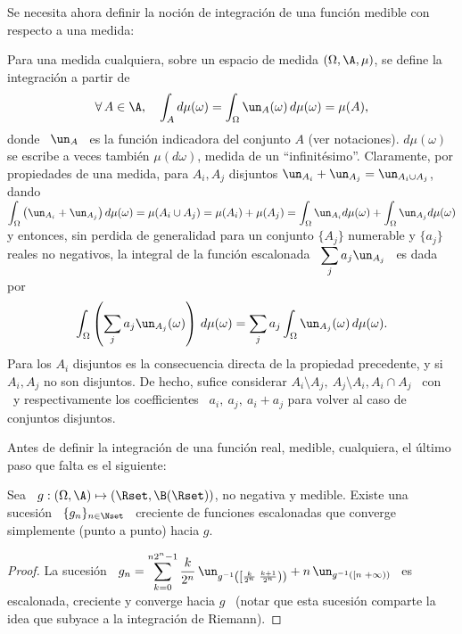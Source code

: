 Se necesita ahora definir la  noci\'on de integraci\'on de una funci\'on medible
con respecto a una medida:
%
\begin{definicion}
\label{Def:MP:MedidaIntegracion}
%
  Para una medida  cualquiera, sobre un espacio de  medida $(\Omega,\A,\mu)$, se
  define la integraci\'on a partir de
  \[
  \forall \, A \in \A,  \quad \int_A d\mu(\omega) = \int_\Omega \un_A(\omega) \,
  d\mu(\omega) = \mu(A),
  \]
  donde  \  $\un_A$  \  es   la  funci\'on  indicadora  del  conjunto  $A$  (ver
  notaciones).   $d\mu(\omega)$  se escribe  a  veces tambi\'en  $\mu(d\omega)$,
  medida de  un ``infinit\'esimo''.  Claramente, por propiedades  de una medida,
  para $ A_i, A_j$ disjuntos $\un_{A_i} + \un_{A_j} = \un_{A_i \cup A_j}$, dando
  $\displaystyle \int_\Omega \left( \un_{A_i} + \un_{A_j} \right) d\mu(\omega) =
  \mu(A_i \cup A_j) = \mu(A_i) + \mu(A_j) = \int_\Omega \un_{A_i} d\mu(\omega) +
  \int_\Omega  \un_{A_j} d\mu(\omega)$  y entonces,  sin perdida  de generalidad
  para un conjunto $\{ A_j \}$ numerable
  y $\{  a_j \}$ reales no negativos,  la integral de la  funci\'on escalonada \
  $\displaystyle \sum_j a_j \un_{A_j}$ \ es dada por
  \[
  \int_\Omega \left( \sum_j a_j \un_{A_j}(\omega) \right) \, d\mu(\omega) =
  \sum_j a_j \int_\Omega \un_{A_j}(\omega) \, d\mu(\omega).
  \]
  Para  los  $A_i$  disjuntos  es   la  consecuencia  directa  de  la  propiedad
  precedente, y  si $A_i,  A_j$ no son  disjuntos.  De hecho,  sufice considerar
  $A_i\setminus  A_j,  \:  A_j\setminus  A_i,  A_i \cap  A_j$  \  con  \modif{$A
    \setminus B = \{ \omega \tq \omega \in  A \: \et \: \omega \not\in B \}$} \
  y respectivamente los coefficientes \ $a_i,  \: a_j, \: a_i + a_j$ para volver
  al caso de conjuntos disjuntos.
\end{definicion}


Antes de definir la integraci\'on de una funci\'on real, medible, cualquiera, el
\'ultimo paso que falta es el siguiente:
%
\begin{teorema}
\label{Teo:MP:MedibleLimite}
%
  Sea   \   $g:   (\Omega,\A)   \mapsto  (\Rset,\B(\Rset))$,   no   negativa   y
  medible. Existe  una sucesi\'on  \ $\{  g_n \}_{n \in  \Nset}$ \  creciente de
  funciones escalonadas que converge simplemente (punto a punto) hacia $g$.
\end{teorema}
%
\begin{proof}
  La  sucesi\'on \ $\displaystyle  g_n =  \sum_{k=0}^{n 2^n-1}  \frac{k}{2^n} \,
  \un_{g^{-1}\left( \left[ \frac{k}{2^n} \; \frac{k+1}{2^n} \right) \right)} + n
  \, \un_{g^{-1}\left(  \left[ n \;  +\infty \right) \right)}$ \  es escalonada,
  creciente y converge  hacia $g$ \ (notar que esta  sucesi\'on comparte la idea
  que subyace a la integraci\'on de Riemann).
\end{proof}

